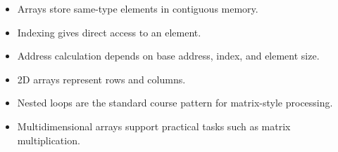 \begin{chapterrecap}
\begin{itemize}
  \item Arrays store same-type elements in contiguous memory.
  \item Indexing gives direct access to an element.
  \item Address calculation depends on base address, index, and element size.
  \item 2D arrays represent rows and columns.
  \item Nested loops are the standard course pattern for matrix-style processing.
  \item Multidimensional arrays support practical tasks such as matrix multiplication.
\end{itemize}
\end{chapterrecap}


